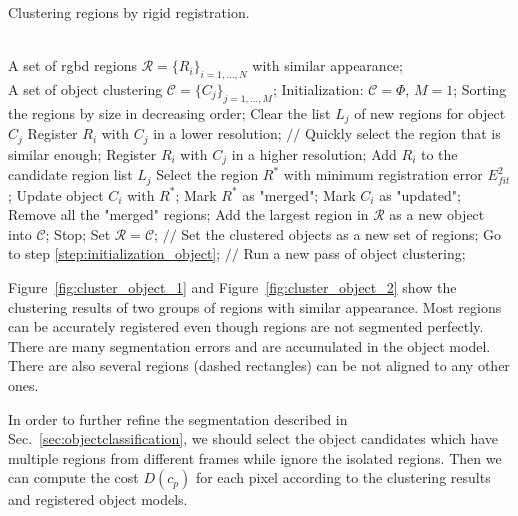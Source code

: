 \begin{algorithm}
\caption{Clustering regions by rigid registration.}
\begin{algorithmic}
\REQUIRE ~~\\
A set of rgbd regions $\mathcal{R}=\{R_i\}_{i=1,\ldots,N}$ with similar appearance;
\ENSURE ~~\\
A set of object clustering $\mathcal{C}=\{C_j\}_{j=1,\ldots,M}$;
\STATE Initialization: $\mathcal{C}=\Phi$, $M=1$; \label{step:initialization_object}
\STATE Sorting the regions by size in decreasing order;
\STATE Clear the list $L_j$ of new regions for object $C_j$
\STATE Register $R_i$ with $C_j$ in a lower resolution;
\STATE $//$ Quickly select the region that is similar enough;
\STATE Register $R_i$ with $C_j$ in a higher resolution;
\STATE Add $R_i$ to the candidate region list $L_j$ 
\ENDIF
\ENDIF
\ENDFOR %
\STATE Select the region $R^*$ with minimum registration error $E^2_{fit}$;
\STATE Update object $C_i$ with $R^*$;
\STATE Mark $R^*$ as "merged"; Mark $C_i$ as "updated";
\ENDFOR %
\STATE Remove all the "merged" regions;
\ELSE
\STATE Add the largest region in $\mathcal{R}$ as a new object into $\mathcal{C}$;
\ENDIF
{}
\STATE Stop;
\ENDIF
\ENDWHILE
\STATE Set $\mathcal{R}=\mathcal{C}$;
\STATE $//$ Set the clustered objects as a new set of regions;
\STATE Go to step \ref{step:initialization_object};
\STATE $//$ Run a new pass of object clustering; 	
\end{algorithmic}
\label{alg:region_registration}
\end{algorithm}


Figure~\ref{fig:cluster_object_1} and Figure~\ref{fig:cluster_object_2} show the clustering results of two groups of regions with similar appearance. 
Most regions can be accurately registered even though regions are not segmented perfectly. There are many segmentation errors and are accumulated in the object model. 
There are also several regions (dashed rectangles) can be not aligned to any other ones. 


 In order to further refine the segmentation described in Sec.~\ref{sec:objectclassification}, we should select the object candidates which have multiple regions from different frames while ignore the isolated regions.
Then we can compute the cost $D(c_p)$ for each pixel according to the clustering results and registered object models. 

